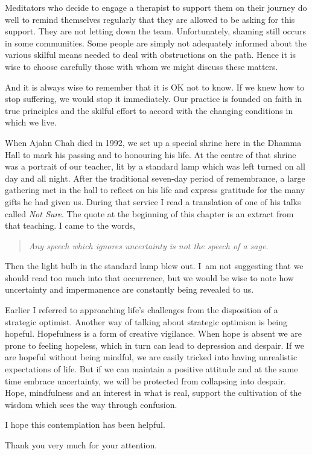 Meditators who decide to engage a therapist to support them on their
journey do well to remind themselves regularly that they are allowed to
be asking for this support. They are not letting down the team.
Unfortunately, shaming still occurs in some communities. Some people are
simply not adequately informed about the various skilful means needed to
deal with obstructions on the path. Hence it is wise to choose carefully
those with whom we might discuss these matters.

And it is always wise to remember that it is OK not to know. If we knew
how to stop suffering, we would stop it immediately. Our practice is
founded on faith in true principles and the skilful effort to accord
with the changing conditions in which we live.

When Ajahn Chah died in 1992, we set up a special shrine here in the Dhamma Hall
to mark his passing and to honouring his life. At the centre of that
shrine was a portrait of our teacher, lit by a standard lamp which was
left turned on all day and all night. After the traditional seven-day
period of remembrance, a large gathering met in the hall to reflect on
his life and express gratitude for the many gifts he had given us.
During that service I read a translation of one of his talks called
\emph{Not Sure}.\thinspace \cite{not-sure} The quote at the beginning of this chapter is
an extract from that teaching. I came to the words,

\begin{quote}
\itshape
Any speech which ignores uncertainty is not the speech of a sage.
\end{quote}

Then the light bulb in the standard lamp blew out. I~am not suggesting that we
should read too much into that occurrence, but we would be wise to note how
uncertainty and impermanence are constantly being revealed to us.

Earlier I referred to approaching life's challenges from the disposition
of a strategic optimist. Another way of talking about strategic optimism
is being hopeful. Hopefulness is a form of creative vigilance. When hope
is absent we are prone to feeling hopeless, which in turn can lead to
depression and despair. If we are hopeful without being mindful, we are
easily tricked into having unrealistic expectations of life. But if we
can maintain a positive attitude and at the same time embrace
uncertainty, we will be protected from collapsing into despair. Hope,
mindfulness and an interest in what is real, support the cultivation of
the wisdom which sees the way through confusion.

I hope this contemplation has been helpful.

Thank you very much for your attention.

